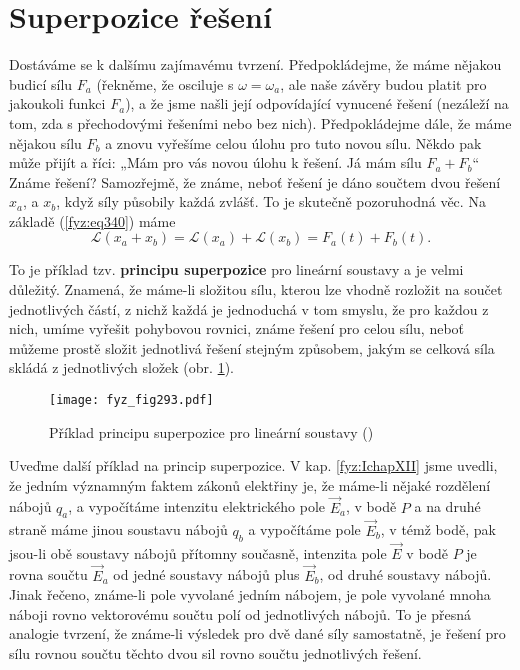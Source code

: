 {  \section{Superpozice řešení}\label{fyz:IchapXXVsecII}
    Dostáváme se k dalšímu zajímavému tvrzení. Předpokládejme, že máme nějakou budicí sílu \(F_a\) 
    (řekněme, že osciluje s \(\omega = \omega_a\), ale naše závěry budou platit pro jakoukoli 
    funkci \(F_a\)), a že jsme našli její odpovídající vynucené řešení (nezáleží na tom, zda s 
    přechodovými řešeními nebo bez nich). Předpokládejme dále, že máme nějakou sílu \(F_b\) a znovu 
    vyřešíme celou úlohu pro tuto novou sílu. Někdo pak může přijít a říci: „Mám pro vás novou 
    úlohu k řešení. Já mám sílu \(F_a + F_b\)“ Známe řešení? Samozřejmě, že známe, neboť řešení je 
    dáno součtem dvou řešení \(x_a\), a \(x_b\), když síly působily každá zvlášť. To je skutečně 
    pozoruhodná věc. Na základě (\ref{fyz:eq340}) máme
    \begin{equation}\label{fyz:eq345}
      \mathscr{L}(x_a + x_b) = \mathscr{L}(x_a) + \mathscr{L}(x_b) = F_a(t) + F_b(t).
    \end{equation}
    
    To je příklad tzv.\textbf{ principu superpozice} pro lineární soustavy a je velmi důležitý. 
    Znamená, že máme-li složitou sílu, kterou lze vhodně rozložit na součet jednotlivých částí, z 
    nichž každá je jednoduchá v tom smyslu, že pro každou z nich, umíme vyřešit pohybovou rovnici, 
    známe řešení pro celou sílu, neboť můžeme prostě složit jednotlivá řešení stejným způsobem, 
    jakým se celková síla skládá z jednotlivých složek (obr. \ref{fyz:fig293}).

    \begin{figure}[ht!] %
      \centering
      \texttt{[image: fyz\_fig293.pdf]}
      \caption{Příklad principu superpozice pro lineární soustavy
               (\cite[s.~334]{Feynman01})}
      \label{fyz:fig293}
    \end{figure}
    
    Uveďme další příklad na princip superpozice. V kap. \ref{fyz:IchapXII} jsme uvedli, že jedním 
    významným faktem zákonů elektřiny je, že máme-li nějaké rozdělení nábojů \(q_a\), a vypočítáme 
    intenzitu elektrického pole \(\vec{E}_a\), v bodě \(P\) a na druhé straně máme jinou soustavu 
    nábojů \(q_b\) a vypočítáme pole \(\vec{E}_b\), v témž bodě, pak jsou-li obě soustavy nábojů 
    přítomny současně, intenzita pole \(\vec{E}\) v bodě \(P\) je rovna součtu \(\vec{E}_a\) od 
    jedné soustavy nábojů plus \(\vec{E}_b\), od druhé soustavy nábojů. Jinak řečeno, známe-li pole 
    vyvolané jedním nábojem, je pole vyvolané mnoha náboji rovno vektorovému součtu polí od 
    jednotlivých nábojů. To je přesná analogie tvrzení, že známe-li výsledek pro dvě dané síly 
    samostatně, je řešení pro sílu rovnou součtu těchto dvou sil rovno součtu jednotlivých řešení.
    
}
